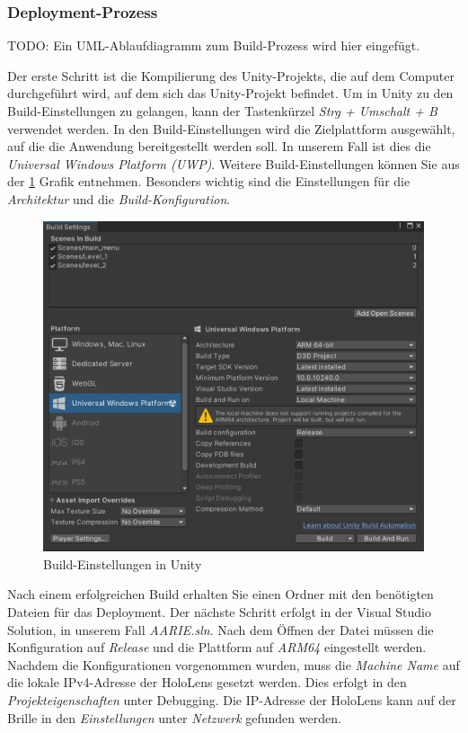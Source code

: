 \subsubsection{Deployment-Prozess}

TODO: Ein UML-Ablaufdiagramm zum Build-Prozess wird hier eingefügt.

Der erste Schritt ist die Kompilierung des Unity-Projekts, die auf dem Computer durchgeführt wird, auf dem sich das
Unity-Projekt befindet. Um in Unity zu den Build-Einstellungen zu gelangen, kann der Tastenkürzel \textit{Strg + Umschalt + B}
verwendet werden. In den Build-Einstellungen wird die Zielplattform ausgewählt, auf die die Anwendung bereitgestellt
werden soll. In unserem Fall ist dies die \textit{Universal Windows Platform (UWP)}. Weitere Build-Einstellungen können
Sie aus der \ref{fig:build-settings} Grafik entnehmen. Besonders wichtig sind die Einstellungen für die \textit{Architektur} und
die \textit{Build-Konfiguration}.

\begin{figure}[H]
    \centering
    \includegraphics[scale=0.6]{images/build}
    \caption{Build-Einstellungen in Unity}
    \label{fig:build-settings}
\end{figure}

Nach einem erfolgreichen Build erhalten Sie einen Ordner mit den benötigten Dateien für das Deployment. Der nächste
Schritt erfolgt in der Visual Studio Solution, in unserem Fall \textit{AARIE.sln}. Nach dem Öffnen der Datei müssen die
Konfiguration auf \textit{Release} und die Plattform auf \textit{ARM64} eingestellt werden. Nachdem die Konfigurationen
vorgenommen wurden, muss die \textit{Machine Name} auf die lokale IPv4-Adresse der HoloLens gesetzt werden. Dies erfolgt in
den \textit{Projekteigenschaften} unter Debugging. Die IP-Adresse der HoloLens kann auf der Brille in den \textit{Einstellungen}
unter \textit{Netzwerk} gefunden werden.

